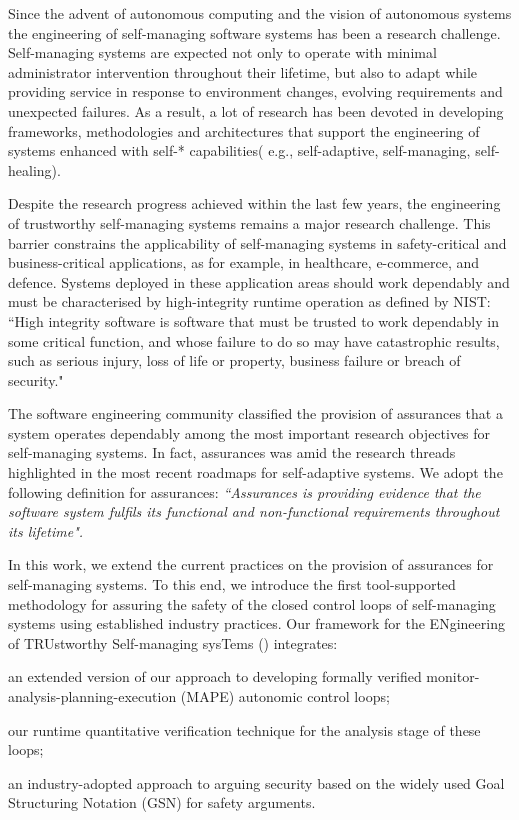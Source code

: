 
Since the advent of autonomous computing and the vision of autonomous systems the engineering of self-managing software systems has been a research challenge. Self-managing systems are expected not only to operate with minimal administrator intervention throughout their lifetime, but also to adapt while providing service in response to environment changes, evolving requirements and unexpected failures. As a result, a lot of research has been devoted in developing frameworks, methodologies and architectures that support the engineering of systems enhanced with self-* capabilities( e.g., self-adaptive, self-managing, self-healing). 

Despite the research progress achieved within the last few years, the engineering of trustworthy self-managing systems remains a major research challenge. This barrier constrains the applicability of self-managing systems in safety-critical and business-critical applications, as for example, in healthcare, e-commerce, and defence. Systems deployed in these application areas should work dependably and must be characterised by high-integrity runtime operation as defined by NIST: ``High integrity software is software that must be trusted to work dependably in some critical function, and whose failure to do so may have catastrophic results, such as serious injury, loss of life or property, business failure or breach of security."


The software engineering community classified the provision of assurances that a system operates dependably among the most important research objectives for self-managing systems. In fact, assurances was amid the research threads highlighted in the most recent roadmaps for self-adaptive systems. We adopt the following definition for assurances: \textit{``Assurances is providing evidence that the software system fulfils its functional and non-functional requirements throughout its lifetime".}

In this work, we extend the current practices on the provision of assurances for self-managing systems. To this end, we introduce the first tool-supported methodology for assuring the safety of the closed control loops of self-managing systems using established industry practices. Our framework for the ENgineering of TRUstworthy Self-managing sysTems (\approach) integrates:
\squishlist
	\item an extended version of our approach to developing formally verified monitor-analysis-planning-execution (MAPE) autonomic control loops;
	\item our runtime quantitative verification technique for the analysis stage of these loops;
	\item an industry-adopted approach to arguing security based on the widely used Goal Structuring Notation (GSN) for safety arguments.
\squishend
